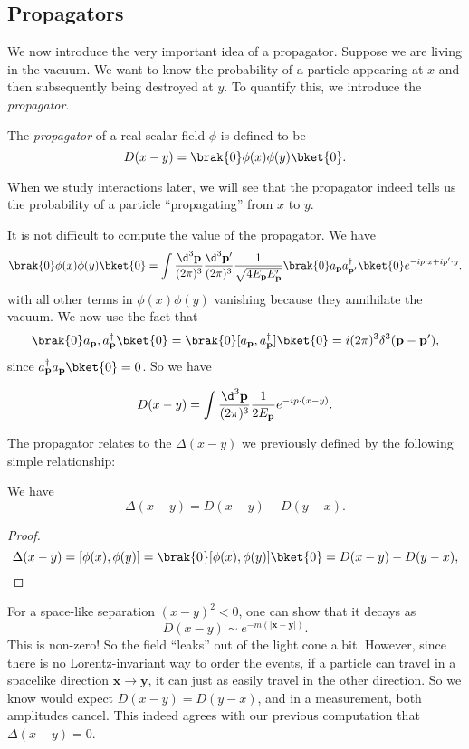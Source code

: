 \documentclass[a4paper]{article}
\begin{document}
\subsection{Propagators}
We now introduce the very important idea of a propagator. Suppose we are living in the vacuum. We want to know the probability of a particle appearing at $x$ and then subsequently being destroyed at $y$. To quantify this, we introduce the \emph{propagator}.
\begin{defi}[Propagator]
  The \emph{propagator} of a real scalar field $\phi$ is defined to be
  \[
    D(x - y) = \brak{0}\phi(x) \phi(y) \bket{0}.
  \]
\end{defi}
When we study interactions later, we will see that the propagator indeed tells us the probability of a particle ``propagating'' from $x$ to $y$.

It is not difficult to compute the value of the propagator. We have
\[
  \brak{0}\phi(x) \phi(y) \bket{0} = \int \frac{\d^3 \mathbf{p}}{(2\pi)^3} \frac{\d^3 \mathbf{p}'}{(2\pi)^3} \frac{1}{\sqrt{4E_\mathbf{p} E_\mathbf{p}'}} \brak{0}a_\mathbf{p} a_{\mathbf{p}'}^\dagger \bket{0} e^{-i p \cdot x + i p' \cdot y}.
\]
with all other terms in $\phi(x) \phi(y)$ vanishing because they annihilate the vacuum. We now use the fact that
\[
  \brak{0}a_\mathbf{p}, a_\mathbf{p}^\dagger\bket{0} = \brak{0}[a_\mathbf{p}, a_\mathbf{p}^\dagger]\bket{0} = i (2\pi)^3 \delta^3 (\mathbf{p} - \mathbf{p}'),
\]
since $a_\mathbf{p}^\dagger a_\mathbf{p} \bket{0} = 0$. So we have
\begin{prop}
  \[
    D(x - y) = \int \frac{\d^3 \mathbf{p}}{(2\pi)^3} \frac{1}{2 E_\mathbf{p}} e^{-i p \cdot (x - y)}.
  \]
\end{prop}

The propagator relates to the $\Delta(x - y)$ we previously defined by the following simple relationship:
\begin{prop}
  We have
  \[
    \Delta(x - y) = D(x - y) - D(y - x).
  \]
\end{prop}

\begin{proof}
  \[
    \Delta(x - y) = [\phi(x), \phi(y)] = \brak{0}[\phi(x), \phi(y)]\bket{0} = D(x - y) - D(y - x),
  \]
\end{proof}

For a space-like separation $(x - y)^2 < 0$, one can show that it decays as
\[
  D(x - y) \sim e^{-m(|\mathbf{x} - \mathbf{y}|)}.
\]
This is non-zero! So the field ``leaks'' out of the light cone a bit. However, since there is no Lorentz-invariant way to order the events, if a particle can travel in a spacelike direction $\mathbf{x} \to \mathbf{y}$, it can just as easily travel in the other direction. So we know would expect $D(x - y) = D(y - x)$, and in a measurement, both amplitudes cancel. This indeed agrees with our previous computation that $\Delta(x - y) = 0$.
\end{document}
